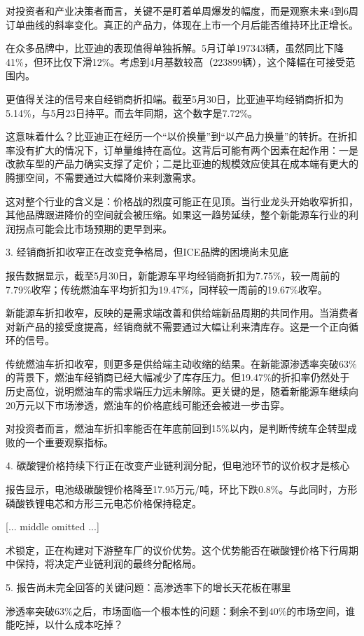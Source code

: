 \documentclass[11pt]{ctexart}
\begin{document}
对投资者和产业决策者而言，关键不是盯着单周爆发的幅度，而是观察未来4到6周订单曲线的斜率变化。真正的产品力，体现在上市一个月后能否维持环比正增长。

在众多品牌中，比亚迪的表现值得单独拆解。5月订单197343辆，虽然同比下降41\%，但环比仅下滑12\%。考虑到4月基数较高（223899辆），这个降幅在可接受范围内。

更值得关注的信号来自经销商折扣端。截至5月30日，比亚迪平均经销商折扣为5.14\%，与5月23日持平。而去年同期，这个数字是7.72\%。

这意味着什么？比亚迪正在经历一个“以价换量”到“以产品力换量”的转折。在折扣率没有扩大的情况下，订单量维持在高位。这背后可能有两个因素在起作用：一是改款车型的产品力确实支撑了定价；二是比亚迪的规模效应使其在成本端有更大的腾挪空间，不需要通过大幅降价来刺激需求。

这对整个行业的含义是：价格战的烈度可能正在见顶。当行业龙头开始收窄折扣，其他品牌跟进降价的空间就会被压缩。如果这一趋势延续，整个新能源车行业的利润拐点可能会比市场预期的更早到来。

3. 经销商折扣收窄正在改变竞争格局，但ICE品牌的困境尚未见底

报告数据显示，截至5月30日，新能源车平均经销商折扣为7.75\%，较一周前的7.79\%收窄；传统燃油车平均折扣为19.47\%，同样较一周前的19.67\%收窄。

新能源车折扣收窄，反映的是需求端改善和供给端新品周期的共同作用。当消费者对新产品的接受度提高，经销商就不需要通过大幅让利来清库存。这是一个正向循环的信号。

传统燃油车折扣收窄，则更多是供给端主动收缩的结果。在新能源渗透率突破63\%的背景下，燃油车经销商已经大幅减少了库存压力。但19.47\%的折扣率仍然处于历史高位，说明燃油车的需求端压力远未解除。更关键的是，随着新能源车继续向20万元以下市场渗透，燃油车的价格底线可能还会被进一步击穿。

对投资者而言，燃油车折扣率能否在年底前回到15\%以内，是判断传统车企转型成败的一个重要观察指标。

4. 碳酸锂价格持续下行正在改变产业链利润分配，但电池环节的议价权才是核心

报告显示，电池级碳酸锂价格降至17.95万元/吨，环比下跌0.8\%。与此同时，方形磷酸铁锂电芯和方形三元电芯价格保持稳定。

[... middle omitted ...]

术锁定，正在构建对下游整车厂的议价优势。这个优势能否在碳酸锂价格下行周期中保持，将决定产业链利润的最终分配格局。

5. 报告尚未完全回答的关键问题：高渗透率下的增长天花板在哪里

渗透率突破63\%之后，市场面临一个根本性的问题：剩余不到40\%的市场空间，谁能吃掉，以什么成本吃掉？
\end{document}
